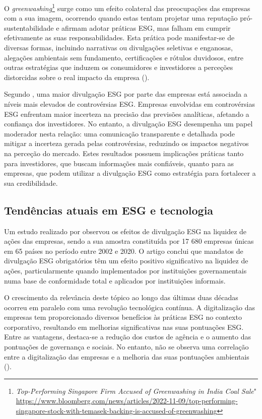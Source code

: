 O \textit{greenwashing}\footnote{\textit{Top-Performing Singapore Firm Accused of Greenwashing in India Coal Sale}" \url{https://www.bloomberg.com/news/articles/2022-11-09/top-performing-singapore-stock-with-temasek-backing-is-accused-of-greenwashing}} surge como um efeito colateral das preocupações das empresas com a sua imagem, ocorrendo quando estas tentam projetar uma reputação pró-sustentabilidade e afirmam adotar práticas ESG, mas falham em cumprir efetivamente as suas responsabilidades. Esta prática pode manifestar-se de diversas formas, incluindo narrativas ou divulgações seletivas e enganosas, alegações ambientais sem fundamento, certificações e rótulos duvidosos, entre outras estratégias que induzem os consumidores e investidores a perceções distorcidas sobre o real impacto da empresa (\cite{Rau2024}).

Segundo \cite{Schiemann2022}, uma maior divulgação ESG por parte das empresas está associada a níveis mais elevados de controvérsias ESG. Empresas envolvidas em controvérsias ESG enfrentam maior incerteza na precisão das previsões analíticas, afetando a confiança dos investidores. No entanto, a divulgação ESG desempenha um papel moderador nesta relação: uma comunicação transparente e detalhada pode mitigar a incerteza gerada pelas controvérsias, reduzindo os impactos negativos na perceção do mercado. Estes resultados possuem implicações práticas tanto para investidores, que buscam informações mais confiáveis, quanto para as empresas, que podem utilizar a divulgação ESG como estratégia para fortalecer a sua credibilidade.


\subsection{Tendências atuais em ESG e tecnologia}
\label{subsec: TAESG}

Um estudo realizado por \cite{Krueger2024} observou os efeitos de divulgação ESG na liquidez de ações das empresas, sendo a sua amostra constituída por 17 680 empresas únicas em 65 países no período entre 2002 e 2020. O artigo conclui que mandatos de divulgação ESG obrigatórios têm um efeito positivo significativo na liquidez de ações, particularmente quando implementados por instituições governamentais numa base de conformidade total e aplicados por instituições informais.

O crescimento da relevância deste tópico ao longo das últimas duas décadas ocorreu em paralelo com uma revolução tecnológica contínua. A digitalização das empresas tem proporcionado diversos benefícios às práticas ESG no contexto corporativo, resultando em melhorias significativas nas suas pontuações ESG. Entre as vantagens, destaca-se a redução dos custos de agência e o aumento das pontuações de governança e sociais. No entanto, não se observa uma correlação entre a digitalização das empresas e a melhoria das suas pontuações ambientais (\cite{Fang2023}).

